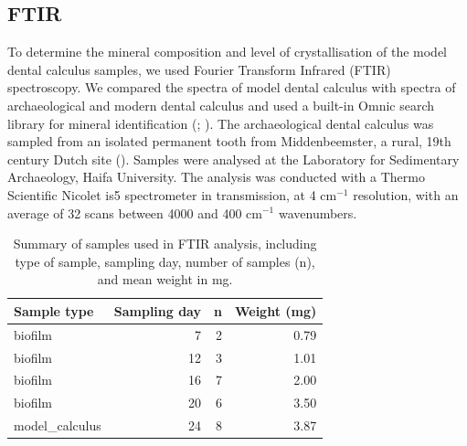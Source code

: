 \documentclass[
  b5paper,
]{book}
\begin{document}
\subsection{FTIR}\label{ftir}

To determine the mineral composition and level of crystallisation of the
model dental calculus samples, we used Fourier Transform Infrared (FTIR)
spectroscopy. We compared the spectra of model dental calculus with
spectra of archaeological and modern dental calculus and used a built-in
Omnic search library for mineral identification
(;
). The
archaeological dental calculus was sampled from an isolated permanent
tooth from Middenbeemster, a rural, 19th century Dutch site
().
Samples were analysed at the Laboratory for Sedimentary Archaeology,
Haifa University. The analysis was conducted with a Thermo Scientific
Nicolet is5 spectrometer in transmission, at 4 cm\(^{-1}\) resolution,
with an average of 32 scans between 4000 and 400 cm\(^{-1}\)
wavenumbers.

\begin{longtable}[]{@{}lrrr@{}}

\caption{\label{tbl-ftir-byoc}Summary of samples used in FTIR analysis,
including type of sample, sampling day, number of samples (n), and mean
weight in mg.}

\tabularnewline

\toprule\noalign{}
Sample type & Sampling day & n & Weight (mg) \\
\midrule\noalign{}
\endhead
\bottomrule\noalign{}
\endlastfoot
biofilm & 7 & 2 & 0.79 \\
biofilm & 12 & 3 & 1.01 \\
biofilm & 16 & 7 & 2.00 \\
biofilm & 20 & 6 & 3.50 \\
model\_calculus & 24 & 8 & 3.87 \\

\end{longtable}
\end{document}
